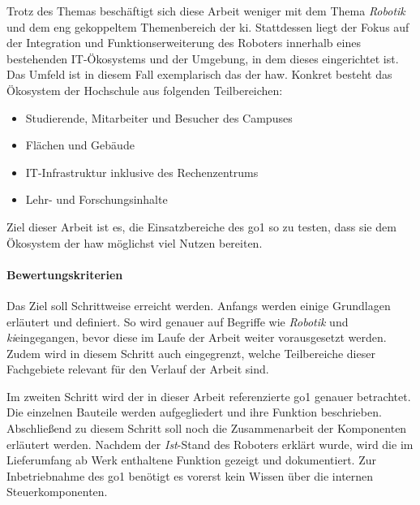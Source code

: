 
Trotz des Themas \emph{\mytitle} beschäftigt sich diese Arbeit weniger mit dem Thema \emph{Robotik} und
dem eng gekoppeltem Themenbereich der \gls{ki}.
Stattdessen liegt der Fokus auf der Integration und Funktionserweiterung des Roboters innerhalb eines
bestehenden IT-Ökosystems und der Umgebung, in dem dieses eingerichtet ist.
Das Umfeld ist in diesem Fall exemplarisch das der \gls{haw}.
Konkret besteht das Ökosystem der Hochschule aus folgenden Teilbereichen:

\begin{itemize}
    \item Studierende, Mitarbeiter und Besucher des Campuses
    \item Flächen und Gebäude
    \item IT-Infrastruktur inklusive des Rechenzentrums
    \item Lehr- und Forschungsinhalte
\end{itemize}

Ziel dieser Arbeit ist es, die Einsatzbereiche des \gls{go1} so zu testen, dass sie dem Ökosystem der \gls{haw} möglichst viel Nutzen bereiten.
\paragraph{Bewertungskriterien}


Das Ziel soll Schrittweise erreicht werden.
Anfangs werden einige Grundlagen erläutert und definiert.
So wird genauer auf Begriffe wie \emph{Robotik} und \emph{\gls{ki}}eingegangen, bevor diese im Laufe der Arbeit
weiter vorausgesetzt werden.
Zudem wird in diesem Schritt auch eingegrenzt, welche Teilbereiche dieser Fachgebiete relevant für den Verlauf der Arbeit sind.

Im zweiten Schritt wird der in dieser Arbeit referenzierte \gls{go1} genauer betrachtet.
Die einzelnen Bauteile werden aufgegliedert und ihre Funktion beschrieben.
Abschließend zu diesem Schritt soll noch die Zusammenarbeit der Komponenten erläutert werden.
Nachdem der \emph{Ist}-Stand des Roboters erklärt wurde, wird die im Lieferumfang ab Werk enthaltene Funktion gezeigt und dokumentiert.
Zur Inbetriebnahme des \gls{go1} benötigt es vorerst kein Wissen über die internen Steuerkomponenten.

